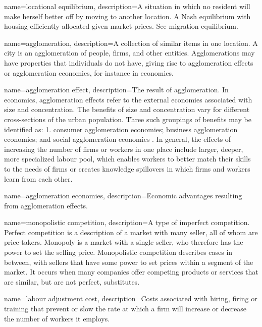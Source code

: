 {
name=locational equilibrium,
description={A situation in which no resident will make herself better off by moving to another location. A Nash equilibrium with housing efficiently allocated  given market prices. See \gls{migration equilibrium}.}
}

{
name=agglomeration,
description={A collection of similar items in one location. A city is an agglomeration of people, firms, and other entities. Agglomerations may have properties that individuals do not have, giving rise to \glspl{agglomeration effect} or \gls{agglomeration economies}, for instance in economics.}
}

{
name=agglomeration effect,
description={The result of \gls{agglomeration}. In economics, \glspl{agglomeration effect} refer to the external economies associated with size and concentration. The benefits of size and concentration vary for different cross-sections of the urban population. Three such groupings of benefits may be identified as: 1. consumer agglomeration economies; business agglomeration economies; and social agglomeration economies \cite{carlinoAgglomerationEconomiesSurvey1978}. In general, the effects of increasing the number of firms or workers in one place include larger, deeper, more specialized labour pool, which enables workers to better match their skills to the needs of firms or creates knowledge spillovers in which firms and workers learn from each other.}
}

{
name=agglomeration economies,
description={Economic advantages %
resulting from \glspl{agglomeration effect}.}
}

{
name=monopolistic competition,
description={A type of  \gls{imperfect competition}. \gls{Perfect competition} is a description of a market with many seller, all of whom are price-takers. Monopoly is a market with a single seller, who therefore has the power to set the selling price. Monopolistic competition describes cases in between, with sellers that have some power to set prices within a segment of the market. It occurs when many companies offer competing products or services that are similar, but are not perfect, substitutes.}
}

{
name=labour adjustment cost,
description={Costs associated with hiring, firing or training that prevent or slow the rate at which a firm will increase or decrease the number of workers it employs.}
}

